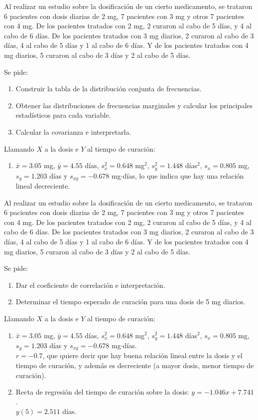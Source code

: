 {Al realizar un estudio sobre la dosificación de un cierto medicamento, se trataron 6 pacientes con dosis diarias de 2
mg, 7 pacientes con 3 mg y otros 7 pacientes con 4 mg. De los pacientes tratados con 2 mg, 2 curaron al cabo de 5 días,
y 4 al cabo de 6 días. De los pacientes tratados con 3 mg diarios, 2 curaron al cabo de 3 días, 4 al cabo de 5 días y 1
al cabo de 6 días. Y de los pacientes tratados con 4 mg diarios, 5 curaron al cabo de 3 días y 2 al cabo de 5 días.

Se pide:
\begin{enumerate}
\item Construir la tabla de la distribución conjunta de frecuencias.
\item Obtener las distribuciones de frecuencias marginales y calcular los principales estadísticos para cada variable. 
\item Calcular la covarianza e interpretarla. 
\end{enumerate}
}
{Llamando $X$ a la dosis e $Y$ al tiempo de curación:
\begin{enumerate}[start=3]
\item $\bar x=3.05$ mg, $\bar y=4.55$ días, $s_x^2=0.648$ mg$^2$, $s_y^2=1.448$ días$^2$, $s_x=0.805$ mg, $s_y=1.203$
días y $s_{xy}=-0.678$ mg$\cdot$días, lo que indica que hay una relación lineal decreciente. 
\end{enumerate}
}
{}


{Al realizar un estudio sobre la dosificación de un cierto medicamento, se trataron 6 pacientes con dosis diarias de 2
mg, 7 pacientes con 3 mg y otros 7 pacientes con 4 mg. De los pacientes tratados con 2 mg, 2 curaron al cabo de 5 días,
y 4 al cabo de 6 días. De los pacientes tratados con 3 mg diarios, 2 curaron al cabo de 3 días, 4 al cabo de 5 días y 1
al cabo de 6 días. Y de los pacientes tratados con 4 mg diarios, 5 curaron al cabo de 3 días y 2 al cabo de 5 días.

Se pide:
\begin{enumerate}
\item Dar el coeficiente de correlación e interpretación.
\item Determinar el tiempo esperado de curación para una dosis de 5 mg diarios.
\end{enumerate}
}
{Llamando $X$ a la dosis e $Y$ al tiempo de curación:
\begin{enumerate}
\item $\bar x=3.05$ mg, $\bar y=4.55$ días, $s_x^2=0.648$ mg$^2$, $s_y^2=1.448$ días$^2$, $s_x=0.805$ mg, $s_y=1.203$
días y $s_{xy}=-0.678$ mg$\cdot$días.\\
$r=-0.7$, que quiere decir que hay buena relación lineal entre la dosis y el tiempo de curación, y además es
decreciente (a mayor dosis, menor tiempo de curación).
\item Recta de regresión del tiempo de curación sobre la dosis: $y=-1.046x+7.741$.\\
$y(5)=2.511$ días.
\end{enumerate}
}
{}


